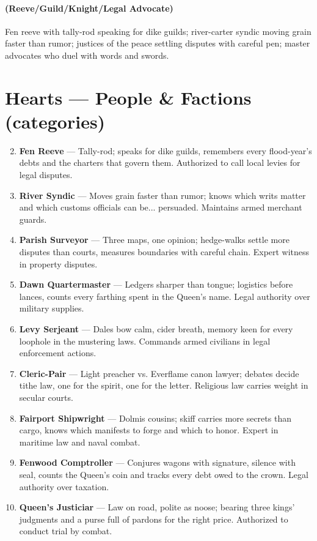 \paragraph*{(Reeve/Guild/Knight/Legal Advocate)} Fen reeve with tally-rod speaking for dike guilds; river-carter syndic moving grain faster than rumor; justices of the peace settling disputes with careful pen; master advocates who duel with words and swords.

\section*{Hearts --- People \& Factions (categories)}
\label{sec:viterra-people}
\begin{enumerate}
\setcounter{enumi}{1}
\item \textbf{Fen Reeve} --- Tally-rod; speaks for dike guilds, remembers every flood-year's debts and the charters that govern them. Authorized to call local levies for legal disputes.
\item \textbf{River Syndic} --- Moves grain faster than rumor; knows which writs matter and which customs officials can be... persuaded. Maintains armed merchant guards.
\item \textbf{Parish Surveyor} --- Three maps, one opinion; hedge-walks settle more disputes than courts, measures boundaries with careful chain. Expert witness in property disputes.
\item \textbf{Dawn Quartermaster} --- Ledgers sharper than tongue; logistics before lances, counts every farthing spent in the Queen's name. Legal authority over military supplies.
\item \textbf{Levy Serjeant} --- Dales bow calm, cider breath, memory keen for every loophole in the mustering laws. Commands armed civilians in legal enforcement actions.
\item \textbf{Cleric-Pair} --- Light preacher vs. Everflame canon lawyer; debates decide tithe law, one for the spirit, one for the letter. Religious law carries weight in secular courts.
\item \textbf{Fairport Shipwright} --- Dolmis cousins; skiff carries more secrets than cargo, knows which manifests to forge and which to honor. Expert in maritime law and naval combat.
\item \textbf{Fenwood Comptroller} --- Conjures wagons with signature, silence with seal, counts the Queen's coin and tracks every debt owed to the crown. Legal authority over taxation.
\item \textbf{Queen's Justiciar} --- Law on road, polite as noose; bearing three kings' judgments and a purse full of pardons for the right price. Authorized to conduct trial by combat.

\end{enumerate}
